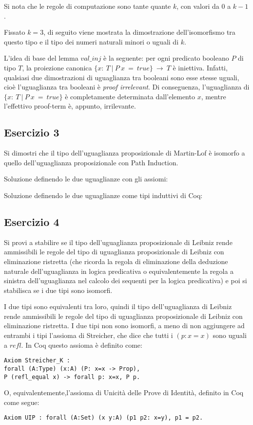 Si nota che le regole di computazione sono tante quante $k$, con valori da $0$ a $k-1$.

Fissato $k=3$, di seguito viene mostrata la dimostrazione dell'isomorfismo tra questo tipo e il tipo dei numeri naturali minori o uguali di $k$.


L'idea di base del lemma $val\_inj$ è la seguente: per ogni predicato booleano $P$ di tipo $T$, la proiezione canonica $\{x:~T~|~P~x~=~true\}~\to~T$ è iniettiva. Infatti, qualsiasi due dimostrazioni di uguaglianza tra booleani sono esse stesse uguali, cioè l'uguaglianza tra booleani è \textit{proof irrelevant}. Di conseguenza, l'uguaglianza di $\{x:~T~|~P~x~=~true\}$ è completamente determinata dall'elemento $x$, mentre l'effettivo proof-term è, appunto, irrilevante.

\subsection{Esercizio 3}\label{isomMLPI}
\begin{thm}
	Si dimostri che il tipo dell'uguaglianza proposizionale di Martin-Lof è isomorfo a quello dell'uguaglianza proposizionale con Path Induction.
\end{thm}
Soluzione definendo le due uguaglianze con gli assiomi:


Soluzione definendo le due uguaglianze come tipi induttivi di Coq:


\subsection{Esercizio 4}
\begin{thm}
	Si provi a stabilire se il tipo dell'uguaglianza proposizionale di Leibniz rende ammissibili le regole del tipo di uguaglianza proposizionale di Leibniz con eliminazione ristretta (che ricorda la regola di eliminazione della deduzione naturale dell'uguaglianza in logica predicativa o equivalentemente la regola a sinistra dell'uguaglianza nel calcolo dei sequenti per la logica predicativa) e poi si stabilisca se i due tipi sono isomorfi.
\end{thm}
I due tipi sono equivalenti tra loro, quindi il tipo dell'uguaglianza di Leibniz rende ammissibili le regole del tipo di uguaglianza proposizionale di Leibniz con eliminazione ristretta. I due tipi non sono isomorfi, a meno di non aggiungere ad entrambi i tipi l'assioma di Streicher, che dice che tutti i $(p : x = x)$ sono uguali a $refl$. In Coq questo assioma è definito come:
\begin{lstlisting}[language=Coq]
Axiom Streicher_K : 
forall (A:Type) (x:A) (P: x=x -> Prop), 
P (refl_equal x) -> forall p: x=x, P p. 
\end{lstlisting}
O, equivalentemente,l'assioma di Unicità delle Prove di Identità, definito in Coq come segue:
\begin{lstlisting}[language=Coq]
Axiom UIP : forall (A:Set) (x y:A) (p1 p2: x=y), p1 = p2. 
\end{lstlisting}

